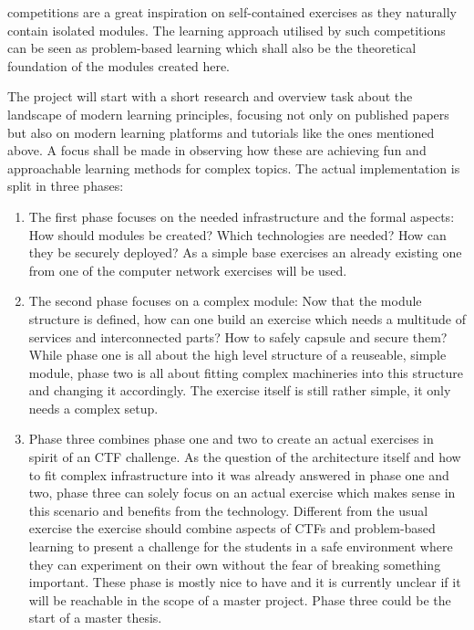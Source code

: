  competitions are a great inspiration on self-contained exercises as they naturally contain isolated modules.
The learning approach utilised by such competitions can be seen as problem-based learning which shall also be the theoretical foundation of the modules created here.

The project will start with a short research and overview task about the landscape of modern learning principles, focusing not only on published papers but also on modern learning platforms and tutorials like the ones mentioned above.
A focus shall be made in observing how these are achieving fun and approachable learning methods for complex topics.  
The actual implementation is split in three phases:

\begin{enumerate}
    \item The first phase focuses on the needed infrastructure and the formal aspects:
    How should modules be created?
    Which technologies are needed?
    How can they be securely deployed?
    As a simple base exercises an already existing one from one of the computer network
    exercises will be used.
    \item The second phase focuses on a complex module: Now that the module structure is defined, how can one build an exercise which needs a multitude of services and interconnected parts?
    How to safely capsule and secure them?
    While phase one is all about the high level structure of a reuseable, simple module,
    phase two is all about fitting complex machineries into this structure and changing it
    accordingly.
    The exercise itself is still rather simple, it only needs a complex setup.
    \item Phase three combines phase one and two to create an actual exercises in spirit
    of an CTF challenge.
    As the question of the architecture itself and how to fit complex infrastructure into it
    was already answered in phase one and two, phase three can solely focus on
    an actual exercise which makes sense in this scenario and benefits from the
    technology.
    Different from the usual exercise the exercise should combine aspects of CTFs and problem-based learning to present a challenge for the students in a safe environment where they can experiment on their own without the fear of breaking something important.
    These phase is mostly nice to have and it is currently unclear if it will be reachable in the scope of a master project.
    Phase three could be the start of a master thesis.
\end{enumerate}

